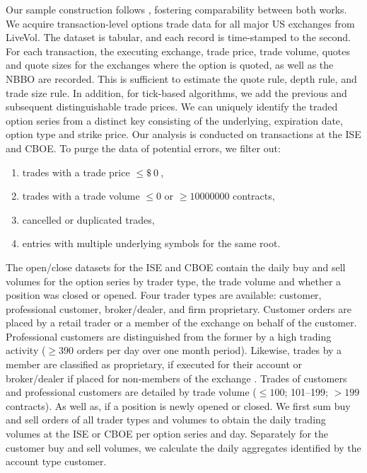 Our sample construction follows \textcite[][7--9]{grauerOptionTradeClassification2022}, fostering comparability between both works. We acquire transaction-level options trade data for all major US exchanges from LiveVol. The dataset is tabular, and each record is time-stamped to the second. For each transaction, the executing exchange, trade price, trade volume, quotes and quote sizes for the exchanges where the option is quoted, as well as the \gls{NBBO} are recorded. This is sufficient to estimate the quote rule, depth rule, and trade size rule. In addition, for tick-based algorithms, we add the previous and subsequent distinguishable trade prices. We can uniquely identify the traded option series from a distinct key consisting of the underlying, expiration date, option type and strike price. Our analysis is conducted on transactions at the \gls{ISE} and \gls{CBOE}. To purge the data of potential errors, we filter out:
\begin{enumerate}[label=(\roman*),noitemsep]
    \item trades with a trade price $\leq \SI{0}[\$]{}$,
    \item trades with a trade volume $\leq 0$ or $\ge \num{10000000}$ contracts,
    \item cancelled or duplicated trades,
    \item entries with multiple underlying symbols for the same root.
\end{enumerate}


The open/close datasets for the \gls{ISE} and \gls{CBOE} contain the daily buy and sell volumes for the option series by trader type, the trade volume and whether a position was closed or opened. Four trader types are available: customer, professional customer, broker/dealer, and firm proprietary. Customer orders are placed by a retail trader or a member of the exchange on behalf of the customer. Professional customers are distinguished from the former by a high trading activity ($\geq390$ orders per day over one month period). Likewise, trades by a member are classified as proprietary, if executed for their account or broker/dealer if placed for non-members of the exchange \autocite[][2]{nasdaqincFrequentlyAskedQuestions2017}. Trades of customers and professional customers are detailed by trade volume ($\leq 100$; 101--199; $> 199$ contracts). As well as, if a position is newly opened or closed. We first sum buy and sell orders of all trader types and volumes to obtain the daily trading volumes at the \gls{ISE} or \gls{CBOE} per option series and day. Separately for the customer buy and sell volumes, we calculate the daily aggregates identified by the account type customer.


